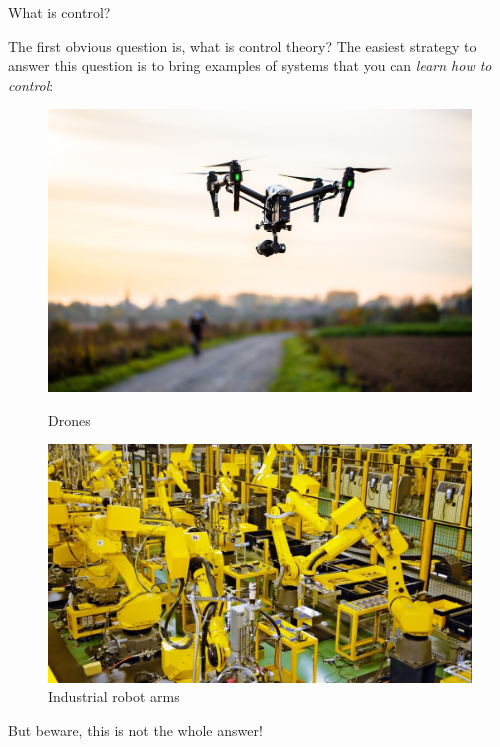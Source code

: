 \documentclass{beamer}
\begin{document}
\begin{frame}{What is control?}
\begin{flushleft}

The first obvious question is, what is control theory? The easiest strategy to answer this question is to bring examples of systems that you can \emph{learn how to control}:

\begin{figure}
  \includegraphics[width=\linewidth]{Picture1.jpg}
  \caption{Drones}
\endminipage\hfill
{}
  \includegraphics[width=\linewidth]{Picture2.jpg}
  \caption{Industrial robot arms}
\endminipage

\end{figure}

But beware, this is not the whole answer!

\end{flushleft}
\end{frame}
\end{document}
